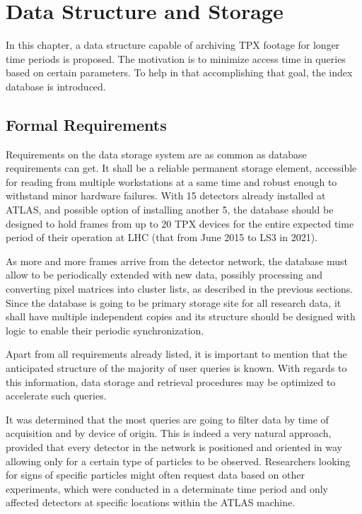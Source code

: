 \chapter{Data Structure and Storage}
In this chapter, a data structure capable of archiving TPX footage for longer time periods is proposed. The motivation is to minimize access time in queries based on certain parameters. To help in that accomplishing that goal, the index database is introduced.

\section{Formal Requirements}
Requirements on the data storage system are as common as database requirements can get. It shall be a reliable permanent storage element, accessible for reading from multiple workstations at a same time and robust enough to withstand minor hardware failures. With 15 detectors already installed at ATLAS, and possible option of installing another 5, the database should be designed to hold frames from up to 20 TPX devices for the entire expected time period of their operation at LHC (that from June 2015 to LS3 in 2021).

\todo

As more and more frames arrive from the detector network, the database must allow to be periodically extended with new data, possibly processing and converting pixel matrices into cluster lists, as described in the previous sections. Since the database is going to be primary storage site for all research data, it shall have multiple independent copies and its structure should be designed with logic to enable their periodic synchronization.

Apart from all requirements already listed, it is important to mention that the anticipated structure of the majority of user queries is known. With regards to this information, data storage and retrieval procedures may be optimized to accelerate such queries.

It was determined that the most queries are going to filter data by time of acquisition and by device of origin. This is indeed a very natural approach, provided that every detector in the network is positioned and oriented in way allowing only for a certain type of particles to be observed. Researchers looking for signs of specific particles might often request data based on other experiments, which were conducted in a determinate time period and only affected detectors at specific locations within the ATLAS machine.

